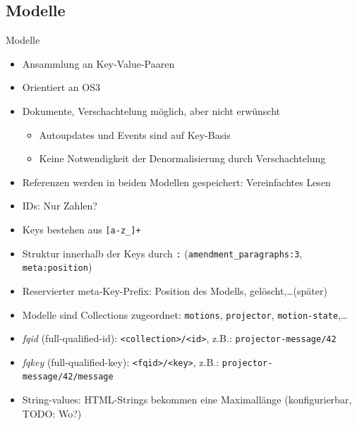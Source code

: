 \documentclass[10pt]{beamer}
\begin{document}
\subsection{Modelle}
\begin{frame}{Modelle}
	\small
	\begin{itemize}
		\item<+-> Ansammlung an Key-Value-Paaren
		\item<+-> Orientiert an OS3
		\item<+-> Dokumente, Verschachtelung möglich, aber nicht erwünscht
		\begin{itemize}
			\item Autoupdates und Events sind auf Key-Basis
			\item Keine Notwendigkeit der Denormalisierung durch Verschachtelung
		\end{itemize}
		\item<+-> Referenzen werden in beiden Modellen gespeichert: Vereinfachtes Lesen 
		\item<+-> IDs: Nur Zahlen?
		\item<+-> Keys bestehen aus \texttt{[a-z\_]+}
		\item<+-> Struktur innerhalb der Keys durch \texttt{:} (\texttt{amendment\_paragraphs:3}, \texttt{meta:position})
		\item<+-> Reservierter meta-Key-Prefix: Position des Modells, gelöscht,\ldots (später)
		\item<+-> Modelle sind Collections zugeordnet: \texttt{motions}, \texttt{projector}, \texttt{motion-state},\ldots
		\item<+-> \textit{fqid} (full-qualified-id): \texttt{<collection>/<id>}, z.B.: \texttt{projector-message/42}
		\item<+-> \textit{fqkey} (full-qualified-key): \texttt{<fqid>/<key>}, z.B.: \texttt{projector-message/42/message}
		\item<+-> String-values: HTML-Strings bekommen eine Maximallänge (konfigurierbar, TODO: Wo?)
	\end{itemize}
	\normalsize
\end{frame}
\end{document}
